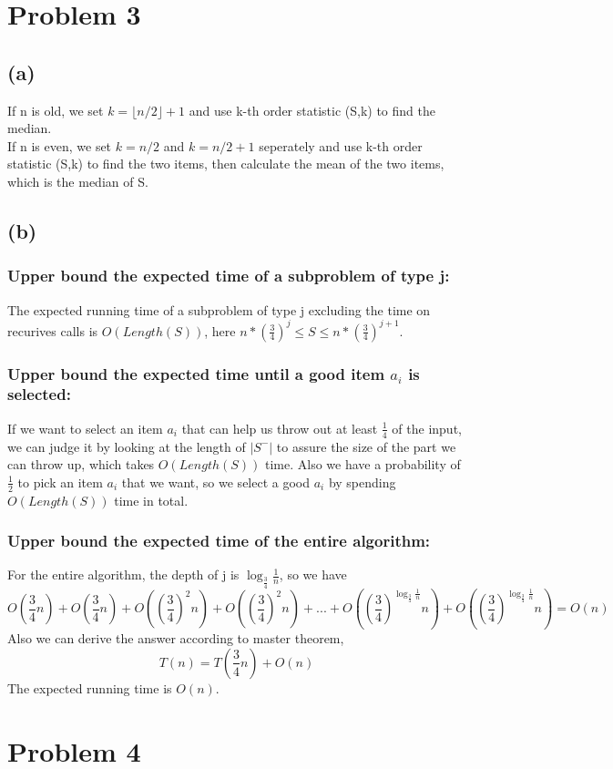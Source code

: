 \documentclass[twoside]{homework}
\begin{document}
\section*{Problem 3}
\subsection*{(a)}
If n is old, we set $k=\lfloor n/2\rfloor+1$ and use k-th order statistic (S,k) to find the median.
\\If n is even, we set $k=n/2$ and $k=n/2+1$ seperately and use k-th order statistic (S,k) to find the two items, then calculate the mean of the two items, which is the median of S.
\subsection*{(b)}
\subsubsection*{Upper bound the expected time of a subproblem of type j:}
The expected running time of a subproblem of type j excluding the time on recurives calls is $O(Length(S))$, here $n*(\frac{3}{4})^j\le S\le n*(\frac{3}{4})^{j+1}$.
\subsubsection*{Upper bound the expected time until a good item $a_i$ is selected:}
If we want to select an item $a_i$ that can help us throw out at least $\frac{1}{4}$ of the input, we can judge it by looking at the length of $|S^-|$ to assure the size of the part we can throw up, which takes $O(Length(S))$ time. Also we have a probability of $\frac{1}{2}$ to pick an item $a_i$ that we want, so we select a good $a_i$ by spending $O(Length(S))$ time in total.
\subsubsection*{Upper bound the expected time of the entire algorithm:}
For the entire algorithm, the depth of j is $\log_{\frac{3}{4}}\frac{1}{n}$, so we have
$$O(\frac{3}{4}n)+O(\frac{3}{4}n)+O((\frac{3}{4})^2n)+O((\frac{3}{4})^2n)+...+O((\frac{3}{4})^{\log_{\frac{3}{4}}\frac{1}{n}}n)+O((\frac{3}{4})^{\log_{\frac{3}{4}}\frac{1}{n}}n)=O(n)$$
Also we can derive the answer according to master theorem,
$$T(n)=T(\frac{3}{4}n)+O(n)$$
The expected running time is $O(n)$.
\section*{Problem 4}
\end{document}

